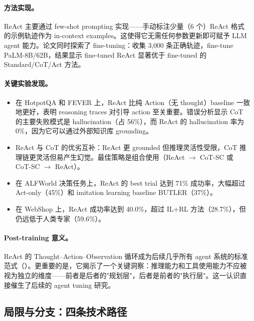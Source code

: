 \paragraph{方法实现。} ReAct 主要通过 few-shot prompting 实现——手动标注少量（6 个）ReAct 格式的示例轨迹作为 in-context examples。这使得它无需任何参数更新即可赋予 LLM agent 能力。论文同时探索了 fine-tuning：收集 3,000 条正确轨迹，fine-tune PaLM-8B/62B，结果显示 fine-tuned ReAct 显著优于 fine-tuned 的 Standard/CoT/Act 方法。

\paragraph{关键实验发现。}

\begin{itemize}[leftmargin=*]
  \item 在 HotpotQA 和 FEVER 上，ReAct 比纯 Action（无 thought）baseline 一致地更好，表明 reasoning traces 对引导 action 至关重要。错误分析显示 CoT 的主要失败模式是 hallucination（占 56\%），而 ReAct 的 hallucination 率为 0\%，因为它可以通过外部知识库 grounding。
  \item ReAct 与 CoT 的优劣互补：ReAct 更 grounded 但推理灵活性受限，CoT 推理链更灵活但易产生幻觉。最佳策略是组合使用（ReAct $\rightarrow$ CoT-SC 或 CoT-SC $\rightarrow$ ReAct）。
  \item 在 ALFWorld 决策任务上，ReAct 的 best trial 达到 71\% 成功率，大幅超过 Act-only（45\%）和 imitation learning baseline BUTLER（37\%）。
  \item 在 WebShop 上，ReAct 成功率达到 40.0\%，超过 IL+RL 方法（28.7\%），但仍远低于人类专家（59.6\%）。
\end{itemize}

\paragraph{Post-training 意义。} ReAct 的 Thought--Action--Observation 循环成为后续几乎所有 agent 系统的标准范式（）。更重要的是，它揭示了一个关键洞察：推理能力和工具使用能力不应被视为独立的维度——前者是后者的"规划层"，后者是前者的"执行层"。这一认识直接催生了后续的 agent tuning 研究。


\subsection{局限与分支：四条技术路径}
\label{sec:t6-branches}

